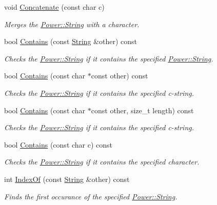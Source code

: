 \begin{DoxyCompactItemize}
void \hyperlink{class_power_1_1_string_ad5714c502a8ca25a8d3afbbf84590c63}{Concatenate} (const char c)
\begin{DoxyCompactList}\small\item\em Merges the \hyperlink{class_power_1_1_string}{Power\+::\+String} with a character. \end{DoxyCompactList}\item 
bool \hyperlink{class_power_1_1_string_aeaa32e499b49e67539953355b53609a8}{Contains} (const \hyperlink{class_power_1_1_string}{String} \&other) const
\begin{DoxyCompactList}\small\item\em Checks the \hyperlink{class_power_1_1_string}{Power\+::\+String} if it contains the specified \hyperlink{class_power_1_1_string}{Power\+::\+String}. \end{DoxyCompactList}\item 
bool \hyperlink{class_power_1_1_string_ad90a05c6e07bcd98684bd7c2aec7723f}{Contains} (const char $\ast$const other) const
\begin{DoxyCompactList}\small\item\em Checks the \hyperlink{class_power_1_1_string}{Power\+::\+String} if it contains the specified c-\/string. \end{DoxyCompactList}\item 
bool \hyperlink{class_power_1_1_string_a7ed6567e4c08c0b61f415039a665d3ff}{Contains} (const char $\ast$const other, size\+\_\+t length) const
\begin{DoxyCompactList}\small\item\em Checks the \hyperlink{class_power_1_1_string}{Power\+::\+String} if it contains the specified c-\/string. \end{DoxyCompactList}\item 
bool \hyperlink{class_power_1_1_string_a728af5dfae32933d8548a657d7cd2043}{Contains} (const char c) const
\begin{DoxyCompactList}\small\item\em Checks the \hyperlink{class_power_1_1_string}{Power\+::\+String} if it contains the specified character. \end{DoxyCompactList}\item 
int \hyperlink{class_power_1_1_string_a91a17a73900ea3e77e01f6d816a5bb39}{Index\+Of} (const \hyperlink{class_power_1_1_string}{String} \&other) const
\begin{DoxyCompactList}\small\item\em Finds the first occurance of the specified \hyperlink{class_power_1_1_string}{Power\+::\+String}. \end{DoxyCompactList}\item 

\end{DoxyCompactItemize}
